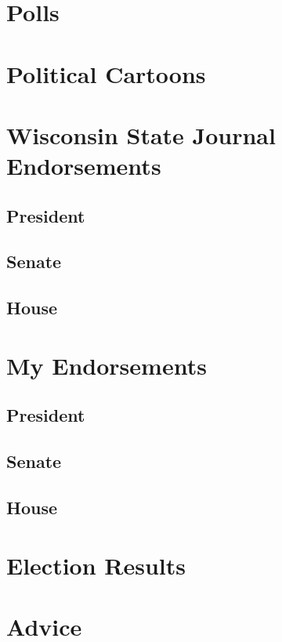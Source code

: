 \documentclass[twoside]{article}
\begin{document}
\newpage
\section{Polls}
\section{Political Cartoons}
\section{Wisconsin State Journal Endorsements}
\subsection{President}
\subsection{Senate}
\subsection{House}
\section{My Endorsements}
\subsection{President}
\subsection{Senate}
\subsection{House}
\section{Election Results}
\section{Advice}
\end{document}

